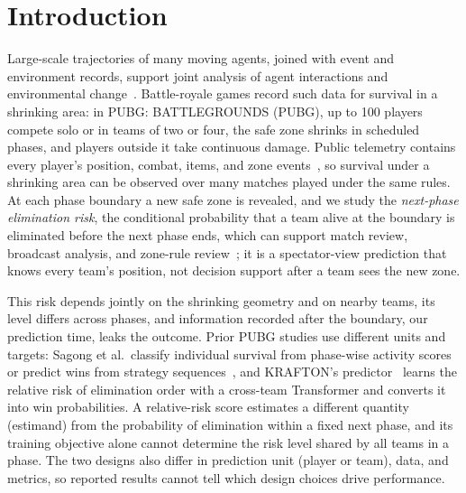 \documentclass[conference]{IEEEtran}
\begin{document}
\section{Introduction}
\label{sec:introduction}

Large-scale trajectories of many moving agents, joined with event and environment records, support joint analysis of agent interactions and environmental change~\cite{Zheng15}.
Battle-royale games record such data for survival in a shrinking area: in PUBG: BATTLEGROUNDS (PUBG), up to 100 players compete solo or in teams of two or four, the safe zone shrinks in scheduled phases, and players outside it take continuous damage.
Public telemetry contains every player's position, combat, items, and zone events~\cite{PUBGAPI}, so survival under a shrinking area can be observed over many matches played under the same rules.
At each phase boundary a new safe zone is revealed, and we study the \emph{next-phase elimination risk}, the conditional probability that a team alive at the boundary is eliminated before the next phase ends, which can support match review, broadcast analysis, and zone-rule review~\cite{PUBGBlueZone2026}; it is a spectator-view prediction that knows every team's position, not decision support after a team sees the new zone.

This risk depends jointly on the shrinking geometry and on nearby teams, its level differs across phases, and information recorded after the boundary, our prediction time, leaks the outcome.
Prior PUBG studies use different units and targets: Sagong et al.\ classify individual survival from phase-wise activity scores~\cite{Sagong25a} or predict wins from strategy sequences~\cite{Sagong25b}, and KRAFTON's predictor~\cite{KRAFTON} learns the relative risk of elimination order with a cross-team Transformer and converts it into win probabilities.
A relative-risk score estimates a different quantity (estimand) from the probability of elimination within a fixed next phase, and its training objective alone cannot determine the risk level shared by all teams in a phase.
The two designs also differ in prediction unit (player or team), data, and metrics, so reported results cannot tell which design choices drive performance.
\end{document}
